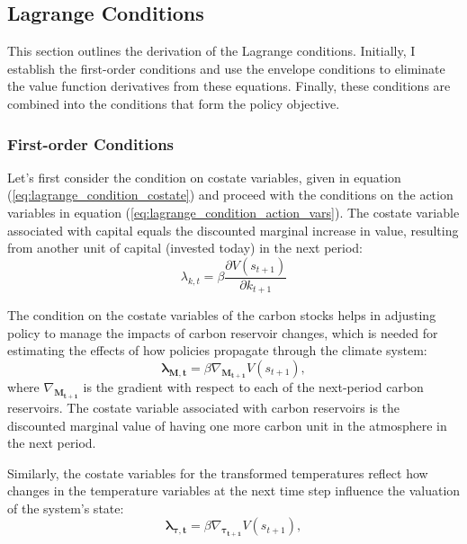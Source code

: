 \subsection{Lagrange Conditions}

This section outlines the derivation of the Lagrange conditions. Initially, I establish the first-order conditions and use the envelope conditions to eliminate the value function derivatives from these equations. Finally, these conditions are combined into the conditions that form the policy objective.

\subsubsection{First-order Conditions}
Let's first consider the condition on costate variables, given in equation (\ref{eq:lagrange_condition_costate}) and proceed with the conditions on the action variables in equation (\ref{eq:lagrange_condition_action_vars}). The costate variable associated with capital equals the discounted marginal increase in value, resulting from another unit of capital (invested today) in the next period: 
\begin{equation}
    \lambda_{k,t} = \beta \frac{\partial V(s_{t+1})}{\partial k_{t+1}}
\label{eq:costate_condition_capital}
\end{equation}

The condition on the costate variables of the carbon stocks helps in adjusting policy to manage the impacts of carbon reservoir changes, which is needed for estimating the effects of how policies propagate through the climate system:
\begin{equation}
    \bm{\lambda_{M,t}} = \beta \nabla_{\bm{M_{t+1}}}V(s_{t+1}),
\label{eq:costate_condition_carbon_reservoir}
\end{equation}
where \(\nabla_{\bm{M_{t+1}}}\) is the gradient with respect to each of the next-period carbon reservoirs. The costate variable associated with carbon reservoirs is the discounted marginal value of having one more carbon unit in the atmosphere in the next period.


Similarly, the costate variables for the transformed temperatures reflect how changes in the temperature variables at the next time step influence the valuation of the system's state:
\begin{equation}
    \bm{\lambda_{\tau, t}} = \beta \nabla_{\bm{\tau_{t+1}}}V(s_{t+1}),
\label{eq:costate_condition_transformed_temp}
\end{equation}

